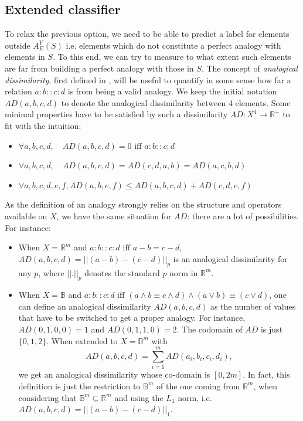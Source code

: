 \subsection{Extended classifier}
\label{EXTENDED_LEARNER}

To relax the previous option, we need to be able to predict a label for
elements outside $A_E^Y(S)$ i.e. elements which do not constitute a perfect analogy
with elements in $S$.  To this end, we can try to measure to what extent such
elements are far from building a perfect analogy with those in $S$.
The concept of {\it analogical dissimilarity}, first  defined in
\cite{BayMicDelIJCAI07}, will be useful to  quantify in some sense how far a
relation $a:b::c:d$ is from being a valid analogy.
We keep the initial notation $AD(a,b,c,d)$ to
denote the analogical dissimilarity between 4 elements.  Some  minimal
properties have to be satisfied by such a dissimilarity $AD: X^4 \longrightarrow \mathbb{R}^+$ to fit with the intuition:
\begin{itemize}
\item $\forall a, b, c, d, \quad  AD(a,b,c,d)=0 \mbox{ iff } a:b::c:d$
\item $\forall a, b, c, d, \quad  AD(a,b,c,d)=AD(c,d,a,b)=AD(a,c,b,d)$
\item $\forall a, b, c, d, e, f,  AD(a,b,e,f) \leq AD(a,b,c,d) + AD(c,d,e,f)$
\end{itemize}
As the definition of an analogy strongly relies on the structure and operators
available on $X$, we have the same situation for $AD$: there are a lot of
possibilities. For instance:
\begin{itemize}
\item When $X=\mathbb{R}^m$ and $a:b::c:d \mbox{ iff } a-b=c-d$, $AD(a,b,c,d) =
  ||(a-b)-(c-d)||_p$ is an analogical dissimilarity for any $p$,
  where $||.||_p$ denotes the standard $p$ norm  in $\mathbb{R}^m$.
\item
When $X=\mathbb{B}$ and $a:b::c:d \mbox{ iff } (a \wedge b \equiv c
  \wedge d) \wedge (a \vee  b) \equiv (c \vee d)$, one can define an analogical
  dissimilarity $AD(a,b,c,d)$ as the number of values that have to be switched
  to get a proper analogy. For instance, $AD(0,1,0,0)=1$ and $AD(0,1,1,0)=2$.
The codomain of $AD$ is just $\{0, 1, 2\}$. When extended to
  $X=\mathbb{B}^m$ with $$AD(a,b,c,d) = \sum\limits_{i=1}^m AD(a_i,b_i,c_i,d_i),$$
  we get an analogical dissimilarity whose co-domain is $[0, 2m]$. In fact,
  this definition is just the restriction to $\mathbb{B}^m$ of the one coming
  from $\mathbb{R}^m$, when considering that $\mathbb{B}^m \subseteq
  \mathbb{R}^m$ and using the $L_1$ norm, i.e. $AD(a,b,c,d) = ||(a-b)-(c-d)||_1$.
\end{itemize}


